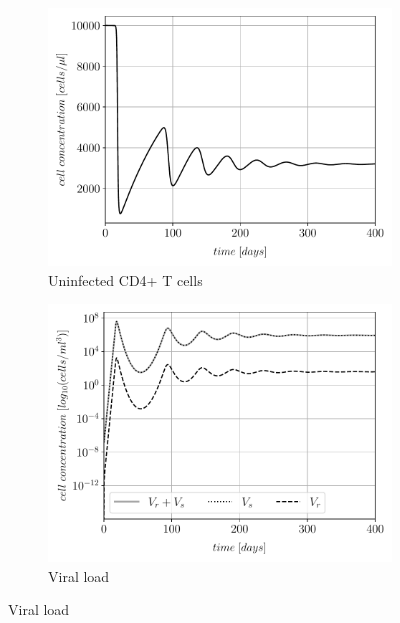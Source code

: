 \begin{figure}
    \centering
    \begin{subfigure}[b]{0.475\textwidth}
        \centering
        \includegraphics[width=\textwidth]{images/eRT_0_alpha_0/untreated_T.pdf}
        \caption[]%
        {{\small Uninfected CD4+ T cells}}    
        \label{fig1a:uninfected_T_cells}
    \end{subfigure}
    \begin{subfigure}[b]{0.475\textwidth}   
        \centering 
        \includegraphics[width=\textwidth]{images/eRT_0_alpha_0/untreated_overview_V.pdf}
        \caption[]%
        {{\small Viral load}}    
        \label{fig1c:viral_load}
    \end{subfigure}

\end{figure}
